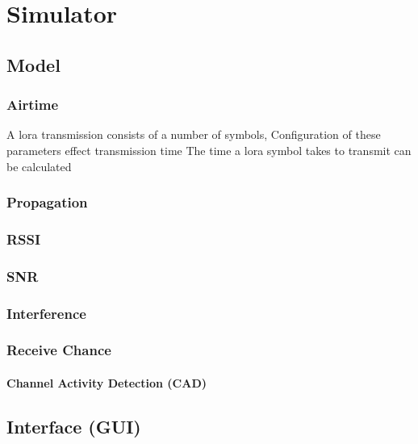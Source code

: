 \chapter{Simulator}
\section{Model}
\subsection{Airtime}
\label{sec:LoRaTiming}
A \ac{lora} transmission consists of a number of symbols, 
Configuration of these parameters effect transmission time
The time a \ac{lora} symbol takes to transmit can be calculated



\subsection{Propagation}
\subsection{RSSI}
\subsection{SNR}
\subsection{Interference}
\label{sec:RadioCollisions}

\subsection{Receive Chance}
\subsubsection{Channel Activity Detection (CAD)}
\section{Interface (GUI)}
